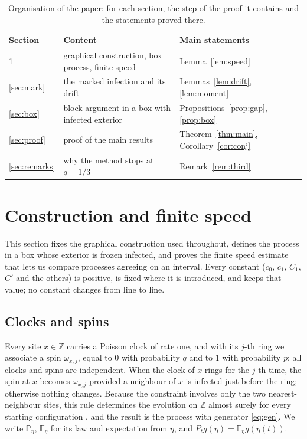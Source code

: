 \documentclass[11pt]{amsart}
\theoremstyle{definition}
\theoremstyle{remark}
\newcommand{\PP}{\mathbb{P}}
\newcommand{\E}{\mathbb{E}}
\newcommand{\Z}{\mathbb{Z}}
\begin{document}
\begin{table}[ht]
\caption{Organisation of the paper: for each section, the step of the proof it contains and the statements proved there.}\label{tab:map}
\begin{center}
\begin{tabular}{lll}
\toprule
Section & Content & Main statements\\
\midrule
\ref{sec:prelim} & graphical construction, box process, finite speed & Lemma~\ref{lem:speed}\\
\ref{sec:mark} & the marked infection and its drift & Lemmas~\ref{lem:drift}, \ref{lem:moment}\\
\ref{sec:box} & block argument in a box with infected exterior & Propositions~\ref{prop:gap}, \ref{prop:box}\\
\ref{sec:proof} & proof of the main results & Theorem~\ref{thm:main}, Corollary~\ref{cor:conj}\\
\ref{sec:remarks} & why the method stops at $q=1/3$ & Remark~\ref{rem:third}\\
\bottomrule
\end{tabular}
\end{center}
\end{table}

\section{Construction and finite speed}\label{sec:prelim}

This section fixes the graphical construction used throughout, defines the process in a box whose exterior is frozen
infected, and proves the finite speed estimate that lets us compare processes agreeing on an interval. Every constant
($c_0$, $c_1$, $C_1$, $C'$ and the others) is positive, is fixed where it is introduced, and keeps that value; no
constant changes from line to line.

\subsection{Clocks and spins}
Every site $x\in\Z$ carries a Poisson clock of rate one, and with its $j$-th ring we associate a spin $\omega_{x,j}$, equal
to $0$ with probability $q$ and to $1$ with probability $p$; all clocks and spins are independent. When the clock of $x$
rings for the $j$-th time, the spin at $x$ becomes $\omega_{x,j}$ provided a neighbour of $x$ is infected just before the
ring; otherwise nothing changes. Because the constraint involves only the two nearest-neighbour sites, this rule determines the evolution on $\Z$
almost surely for every starting configuration \cite{CMRT08}, and the result is the process with generator
\eqref{eq:gen}. We write $\PP_\eta$, $\E_\eta$ for its law and expectation from $\eta$, and $P_tg(\eta)=\E_\eta g(\eta(t))$.
\end{document}
